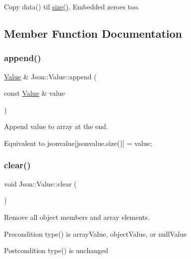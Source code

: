 Copy data() til \hyperlink{classJson_1_1Value_a0ec2808e1d7efa4e9fad938d6667be44}{size()}. Embedded zeroes too. 

\subsection{Member Function Documentation}
\mbox{\label{classJson_1_1Value_a7e49ac977e4bcf59745a09d426669f75}} 
\subsubsection{\texorpdfstring{append()}{append()}}
{\footnotesize\ttfamily \hyperlink{classJson_1_1Value}{Value} \& Json\+::\+Value\+::append (\begin{DoxyParamCaption}\item[{const \hyperlink{classJson_1_1Value}{Value} \&}]{value }\end{DoxyParamCaption})}



Append value to array at the end. 

Equivalent to jsonvalue\mbox{[}jsonvalue.\+size()\mbox{]} = value; \mbox{\label{classJson_1_1Value_a501a4d67e6c875255c2ecc03ccd2019b}} 
\subsubsection{\texorpdfstring{clear()}{clear()}}
{\footnotesize\ttfamily void Json\+::\+Value\+::clear (\begin{DoxyParamCaption}{ }\end{DoxyParamCaption})}

Remove all object members and array elements. \begin{DoxyPrecond}{Precondition}
type() is array\+Value, object\+Value, or null\+Value 
\end{DoxyPrecond}
\begin{DoxyPostcond}{Postcondition}
type() is unchanged 
\end{DoxyPostcond}
\mbox{\label{classJson_1_1Value_afeb7ff596a0929d90c5f2f3cffb413ed}} 

